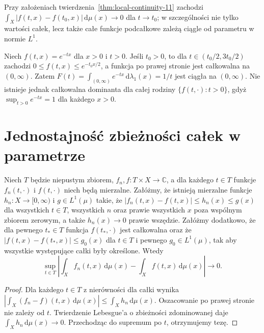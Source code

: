 \begin{wniosek}
\label{cor:l1-param-11}
Przy założeniach twierdzenia~\ref{thm:local-continuity-11}
zachodzi $\int_X|f(t,x)-f(t_0,x)|\,\mathrm d\mu(x)\to0$
dla $t\to t_0$; w szczególności nie tylko wartości całek,
lecz także całe funkcje podcałkowe zależą ciągle od parametru
w normie $L^1$.
\end{wniosek}

\begin{przyklad}
Niech $f(t,x)=e^{-tx}$ dla $x>0$ i $t>0$. Jeśli $t_0>0$,
to dla $t\in(t_0/2,3t_0/2)$ zachodzi
$0\le f(t,x)\le e^{-t_0x/2}$, a funkcja po prawej stronie
jest całkowalna na $(0,\infty)$. Zatem
$F(t)=\int_{(0,\infty)}e^{-tx}\,\mathrm d\lambda_1(x)=1/t$
jest ciągła na $(0,\infty)$. Nie istnieje jednak całkowalna
dominanta dla całej rodziny $\{f(t,\cdot):t>0\}$, gdyż
$\sup_{t>0} e^{-tx}=1$ dla każdego $x>0$.
\end{przyklad}

\section{Jednostajność zbieżności całek w parametrze}

\begin{twierdzenie}
\label{thm:uniform-parameter-11}
Niech $T$ będzie niepustym zbiorem, $f_n,f:T\times X\to\mathbb C$,
a dla każdego $t\in T$ funkcje $f_n(t,\cdot)$ i $f(t,\cdot)$
niech będą mierzalne. Załóżmy, że istnieją mierzalne funkcje
$h_n:X\to[0,\infty)$ i $g\in L^1(\mu)$ takie, że
$|f_n(t,x)-f(t,x)|\le h_n(x)\le g(x)$
dla wszystkich $t\in T$, wszystkich $n$ oraz prawie wszystkich
$x$ poza wspólnym zbiorem zerowym, a także $h_n(x)\to0$
prawie wszędzie. Załóżmy dodatkowo, że dla pewnego
$t_*\in T$ funkcja $f(t_*,\cdot)$ jest całkowalna oraz że
$|f(t,x)-f(t_*,x)|\le g_0(x)$ dla $t\in T$ i pewnego
$g_0\in L^1(\mu)$, tak aby wszystkie występujące całki były
określone. Wtedy
\[
\sup_{t\in T}\left|\int_X f_n(t,x)\,\mathrm d\mu(x)
-\int_Xf(t,x)\,\mathrm d\mu(x)\right|\longrightarrow0.
\]
\end{twierdzenie}
\begin{proof}
Dla każdego $t\in T$ z nierówności dla całki wynika
$|\int_X(f_n-f)(t,x)\,\mathrm d\mu(x)|\le\int_Xh_n\,\mathrm d\mu(x)$.
Oszacowanie po prawej stronie nie zależy od $t$.
Twierdzenie Lebesgue'a o zbieżności zdominowanej daje
$\int_Xh_n\,\mathrm d\mu(x)\to0$. Przechodząc do supremum
po $t$, otrzymujemy tezę.
\end{proof}

